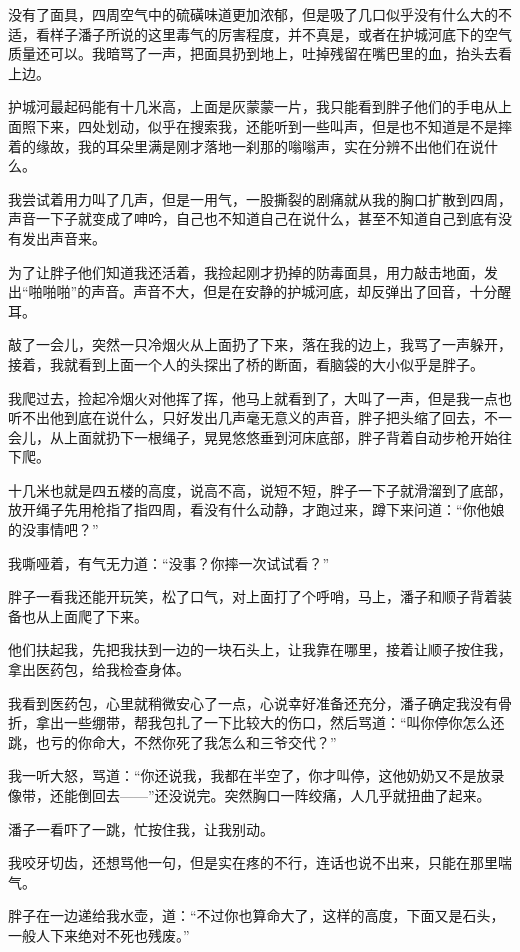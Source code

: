 没有了面具，四周空气中的硫磺味道更加浓郁，但是吸了几口似乎没有什么大的不适，看样子潘子所说的这里毒气的厉害程度，并不真是，或者在护城河底下的空气质量还可以。我暗骂了一声，把面具扔到地上，吐掉残留在嘴巴里的血，抬头去看上边。

护城河最起码能有十几米高，上面是灰蒙蒙一片，我只能看到胖子他们的手电从上面照下来，四处划动，似乎在搜索我，还能听到一些叫声，但是也不知道是不是摔着的缘故，我的耳朵里满是刚才落地一刹那的嗡嗡声，实在分辨不出他们在说什么。

我尝试着用力叫了几声，但是一用气，一股撕裂的剧痛就从我的胸口扩散到四周，声音一下子就变成了呻吟，自己也不知道自己在说什么，甚至不知道自己到底有没有发出声音来。

为了让胖子他们知道我还活着，我捡起刚才扔掉的防毒面具，用力敲击地面，发出“啪啪啪”的声音。声音不大，但是在安静的护城河底，却反弹出了回音，十分醒耳。

敲了一会儿，突然一只冷烟火从上面扔了下来，落在我的边上，我骂了一声躲开，接着，我就看到上面一个人的头探出了桥的断面，看脑袋的大小似乎是胖子。

我爬过去，捡起冷烟火对他挥了挥，他马上就看到了，大叫了一声，但是我一点也听不出他到底在说什么，只好发出几声毫无意义的声音，胖子把头缩了回去，不一会儿，从上面就扔下一根绳子，晃晃悠悠垂到河床底部，胖子背着自动步枪开始往下爬。

十几米也就是四五楼的高度，说高不高，说短不短，胖子一下子就滑溜到了底部，放开绳子先用枪指了指四周，看没有什么动静，才跑过来，蹲下来问道：“你他娘的没事情吧？”

我嘶哑着，有气无力道：“没事？你摔一次试试看？”

胖子一看我还能开玩笑，松了口气，对上面打了个呼哨，马上，潘子和顺子背着装备也从上面爬了下来。

他们扶起我，先把我扶到一边的一块石头上，让我靠在哪里，接着让顺子按住我，拿出医药包，给我检查身体。

我看到医药包，心里就稍微安心了一点，心说幸好准备还充分，潘子确定我没有骨折，拿出一些绷带，帮我包扎了一下比较大的伤口，然后骂道：“叫你停你怎么还跳，也亏的你命大，不然你死了我怎么和三爷交代？”

我一听大怒，骂道：“你还说我，我都在半空了，你才叫停，这他奶奶又不是放录像带，还能倒回去——”还没说完。突然胸口一阵绞痛，人几乎就扭曲了起来。

潘子一看吓了一跳，忙按住我，让我别动。

我咬牙切齿，还想骂他一句，但是实在疼的不行，连话也说不出来，只能在那里喘气。

胖子在一边递给我水壶，道：“不过你也算命大了，这样的高度，下面又是石头，一般人下来绝对不死也残废。”


